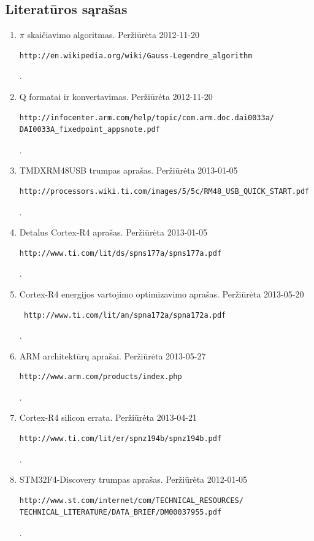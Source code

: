 \documentclass[a4paper, 12pt]{article} %
\begin{document}
\begin{onehalfspacing}
\section*{Literat\={u}ros s\k{a}ra\v{s}as}
\begin{enumerate}
\item $\pi$ skai\v{c}iavimo algoritmas. Per\v{z}i\={u}r\.{e}ta 2012-11-20 \begin{verbatim}http://en.wikipedia.org/wiki/Gauss-Legendre_algorithm\end{verbatim}.  
\item  Q formatai ir konvertavimas. Per\v{z}i\={u}r\.{e}ta 2012-11-20 \begin{verbatim}http://infocenter.arm.com/help/topic/com.arm.doc.dai0033a/
DAI0033A_fixedpoint_appsnote.pdf\end{verbatim}. 
\item TMDXRM48USB trumpas apra\v{s}as. Per\v{z}i\={u}r\.{e}ta 2013-01-05\begin{verbatim}http://processors.wiki.ti.com/images/5/5c/RM48_USB_QUICK_START.pdf\end{verbatim}. 
\item Detalus Cortex-R4 apra\v{s}as. Per\v{z}i\={u}r\.{e}ta 2013-01-05 \begin{verbatim}http://www.ti.com/lit/ds/spns177a/spns177a.pdf\end{verbatim}. 
\item Cortex-R4 energijos vartojimo optimizavimo apra\v{s}as. Per\v{z}i\={u}r\.{e}ta 2013-05-20\begin{verbatim} http://www.ti.com/lit/an/spna172a/spna172a.pdf\end{verbatim}. 
\item ARM architekt\={u}r\k{u} apra\v{s}ai. Per\v{z}i\={u}r\.{e}ta 2013-05-27 \begin{verbatim}http://www.arm.com/products/index.php\end{verbatim}. 
\item Cortex-R4 silicon errata. Per\v{z}i\={u}r\.{e}ta 2013-04-21 \begin{verbatim}
http://www.ti.com/lit/er/spnz194b/spnz194b.pdf \end{verbatim}. 
\item STM32F4-Discovery trumpas apra\v{s}as. Per\v{z}i\={u}r\.{e}ta 2012-01-05 \begin{verbatim}http://www.st.com/internet/com/TECHNICAL_RESOURCES/
TECHNICAL_LITERATURE/DATA_BRIEF/DM00037955.pdf\end{verbatim}. 

\end{enumerate}
\end{onehalfspacing}
\end{document}
